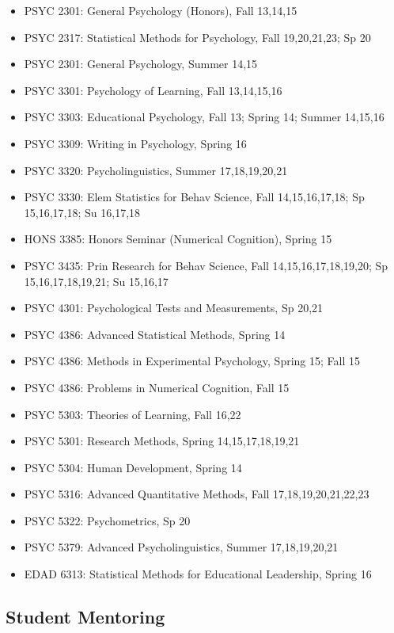 \documentclass[article,10pt]{article}
\begin{document}
\begin{itemize}
\item PSYC 2301: General Psychology (Honors), Fall 13,14,15
\item PSYC 2317: Statistical Methods for Psychology, Fall 19,20,21,23; Sp 20
\item PSYC 2301: General Psychology, Summer 14,15
\item PSYC 3301: Psychology of Learning, Fall 13,14,15,16
\item PSYC 3303: Educational Psychology, Fall 13; Spring 14; Summer 14,15,16
\item PSYC 3309: Writing in Psychology, Spring 16
\item PSYC 3320: Psycholinguistics, Summer 17,18,19,20,21
\item PSYC 3330: Elem Statistics for Behav Science, Fall 14,15,16,17,18; Sp 15,16,17,18; Su 16,17,18
\item HONS 3385: Honors Seminar (Numerical Cognition), Spring 15
\item PSYC 3435: Prin Research for Behav Science, Fall 14,15,16,17,18,19,20; Sp 15,16,17,18,19,21; Su 15,16,17
\item PSYC 4301: Psychological Tests and Measurements, Sp 20,21
\item PSYC 4386: Advanced Statistical Methods, Spring 14
\item PSYC 4386: Methods in Experimental Psychology, Spring 15; Fall 15
\item PSYC 4386: Problems in Numerical Cognition, Fall 15
\item PSYC 5303: Theories of Learning, Fall 16,22
\item PSYC 5301: Research Methods, Spring 14,15,17,18,19,21
\item PSYC 5304: Human Development, Spring 14
\item PSYC 5316: Advanced Quantitative Methods, Fall 17,18,19,20,21,22,23
\item PSYC 5322: Psychometrics, Sp 20
\item PSYC 5379: Advanced Psycholinguistics, Summer 17,18,19,20,21
\item EDAD 6313: Statistical Methods for Educational Leadership, Spring 16
\end{itemize}

\subsection*{Student Mentoring}
\label{sec:orga0757eb}
\end{document}
